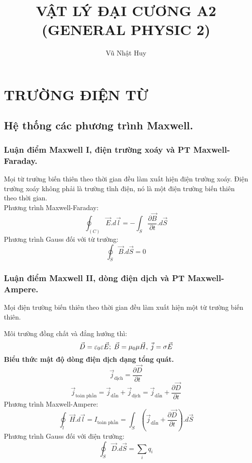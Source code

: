 \documentclass[12pt, a4paper]{report}
\title{VẬT LÝ ĐẠI CƯƠNG A2 (GENERAL PHYSIC 2)}
\author{Vũ Nhật Huy}
\begin{document}
\maketitle
\newpage
\tableofcontents
\newpage
\chapter{TRƯỜNG ĐIỆN TỪ}
\section{Hệ thống các phương trình Maxwell.}
\subsection{Luận điểm Maxwell I, điện trường xoáy và PT Maxwell-Faraday.}
Mọi từ trường biến thiên theo thời gian đều làm xuất hiện điện trường xoáy. Điện trường xoáy không phải là trường tĩnh điện, nó là một điện trường biến thiên theo thời gian.\\
Phương trình Maxwell-Faraday: 
\begin{equation}
    \oint_{(C)} \Vec{E}.d\Vec{l} = -\int_{S} \frac{\partial \Vec{B}}{\partial t}.d\vec{S}
\end{equation}
Phương trình Gauss đối với từ trường: 
\begin{equation}
    \oint_S \vec{B}.d\vec{S} = 0
\end{equation}
\subsection{Luận điểm Maxwell II, dòng điện dịch và PT Maxwell-Ampere.}
Mọi điện trường biến thiên theo thời gian đều làm xuất hiện một từ trường biến thiên.

Môi trường đồng chất và đẳng hướng thì: 
\begin{equation}
    \vec{D} = \varepsilon_0 \varepsilon \vec{E};\thickspace \vec{B} = \mu_0 \mu \vec{H},\thickspace \Vec{j} = \sigma \vec{E}
\end{equation}
\textbf{Biểu thức mật độ dòng điện dịch dạng tổng quát.}
\begin{equation}
    \Vec{j}_{\text{dịch}}=\frac{\partial \vec{D}}{\partial t}
\end{equation}
\begin{equation}
    \Vec{j}_{\text{toàn phần}} = \Vec{j}_{\text{dẫn}} + \Vec{j}_{\text{dịch}} = \Vec{j}_{\text{dẫn}} + \frac{\partial \vec{D}}{\partial t}
\end{equation}
Phương trình Maxwell-Ampere:
\begin{equation}
    \oint_{l} \vec{H}.d\vec{l} = I_{\text{toàn phần}} = \int_{S} \left( \Vec{j}_{\text{dẫn}} + \frac{\partial \vec{D}}{\partial t} \right) .d\vec{S}
\end{equation}
Phương trình Gauss đối với điện trường: 
\begin{equation}
    \oint_S \vec{D}.d\vec{S} = \sum_i q_i
\end{equation}
\end{document}
